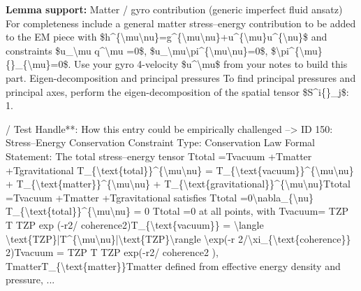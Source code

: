 \textbf{Lemma support:} Matter / gyro contribution (generic imperfect fluid ansatz) For completeness include a general matter stress--energy contribution to be added to the EM piece with \$h\textasciicircum{}\{\textbackslash{}mu\textbackslash{}nu\}=g\textasciicircum{}\{\textbackslash{}mu\textbackslash{}nu\}+u\textasciicircum{}\{\textbackslash{}mu\}u\textasciicircum{}\{\textbackslash{}nu\}\$ and constraints \$u\_\textbackslash{}mu q\textasciicircum{}\textbackslash{}mu =0\$, \$u\_\textbackslash{}mu\textbackslash{}pi\textasciicircum{}\{\textbackslash{}mu\textbackslash{}nu\}=0\$, \$\textbackslash{}pi\textasciicircum{}\{\textbackslash{}mu\}\{\}\_\{\textbackslash{}mu\}=0\$. Use your gyro 4-velocity \$u\textasciicircum{}\textbackslash{}mu\$ from your notes to build this part. Eigen-decomposition and principal pressures To find principal pressures and principal axes, perform the eigen-decomposition of the spatial tensor \$S\textasciicircum{}i\{\}\_j\$: 1.\par
\endgroup

/ Test Handle**: How this entry could be empirically challenged --> ID 150: Stress--Energy Conservation Constraint Type: Conservation Law Formal Statement: The total stress--energy tensor Ttotal  =Tvacuum  +Tmatter  +Tgravitational  T\_\{\textbackslash{}text\{total\}\}\textasciicircum{}\{\textbackslash{}mu\textbackslash{}nu\} = T\_\{\textbackslash{}text\{vacuum\}\}\textasciicircum{}\{\textbackslash{}mu\textbackslash{}nu\} + T\_\{\textbackslash{}text\{matter\}\}\textasciicircum{}\{\textbackslash{}mu\textbackslash{}nu\} + T\_\{\textbackslash{}text\{gravitational\}\}\textasciicircum{}\{\textbackslash{}mu\textbackslash{}nu\}Ttotal   =Tvacuum   +Tmatter   +Tgravitational   satisfies   Ttotal  =0\textbackslash{}nabla\_\{\textbackslash{}nu\} T\_\{\textbackslash{}text\{total\}\}\textasciicircum{}\{\textbackslash{}mu\textbackslash{}nu\} = 0   Ttotal   =0 at all points, with Tvacuum= TZP T   TZP exp (-r2/ coherence2)T\_\{\textbackslash{}text\{vacuum\}\} = \textbackslash{}langle \textbackslash{}text\{TZP\}|T\textasciicircum{}\{\textbackslash{}mu\textbackslash{}nu\}|\textbackslash{}text\{TZP\}\textbackslash{}rangle \textbackslash{}exp(-r 2/\textbackslash{}xi\_\{\textbackslash{}text\{coherence\}\} 2)Tvacuum = TZP T   TZP exp(-r2/ coherence2 ), TmatterT\_\{\textbackslash{}text\{matter\}\}Tmatter defined from effective energy density and pressure, ...

